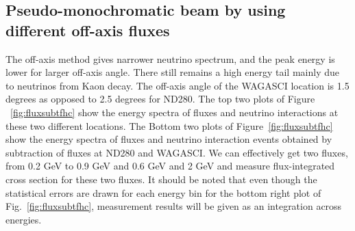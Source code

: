 \subsection{Pseudo-monochromatic beam by using different off-axis fluxes}
The off-axis method gives narrower neutrino spectrum, and the peak energy is lower for larger off-axis angle.
There still remains a high energy tail mainly due to neutrinos from Kaon decay.
The off-axis angle of the WAGASCI location is 1.5 degrees as opposed to
2.5 degrees for ND280.
The top two plots of Figure
~\ref{fig:fluxsubtfhc} show the energy spectra of fluxes and 
neutrino interactions at these two different locations. The Bottom two plots
of Figure~\ref{fig:fluxsubtfhc} show the energy spectra of fluxes and neutrino interaction events obtained by subtraction of fluxes at ND280 and WAGASCI.
We can effectively get two fluxes, from 0.2 GeV to 0.9 GeV and 0.6 GeV and 2 GeV
and measure flux-integrated cross section for these two fluxes.
It should be noted that even though the statistical errors are drawn for each energy bin for the bottom right plot of Fig.~\ref{fig:fluxsubtfhc},
measurement results will be given as an integration across energies.

